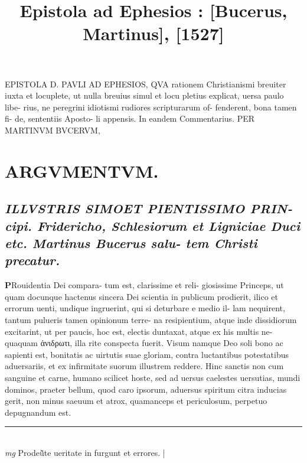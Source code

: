 \documentclass{article}
\begin{document}
\date{}
        \title{ Epistola ad Ephesios : [Bucerus, Martinus], [1527]}
\maketitle
\tableofcontents
\clearpage
\begin{pages} 
\beginnumbering
        EPISTOLA D. PAVLI AD EPHESIOS, QVA rationem Christianismi breuiter iuxta et locuplete, ut nulla breuius simul et locu pletius explicat, uersa paulo libe- rius, ne peregrini idiotismi rudiores scripturarum of- fenderent, bona tamen fi- de, sententiis Aposto- li appensis.  In eandem Commentarius.  PER MARTINVM BVCERVM, 
\section*{ARGVMENTVM.  }
{}
\subsection*{\textit{ILLVSTRIS SIMOET PIENTISSIMO PRIN- cipi.  Fridericho, Schlesiorum et Ligniciae Duci etc. Martinus Bucerus salu- tem Christi precatur.  }}\pstart \huge\textbf{P}\normalsize Rouidentia Dei compara- tum est, clarissime et reli- giosissime Princeps, ut quam docunque hactenus sincera Dei scientia in publicum prodierit, ilico et errorum uenti, undique ingruerint, qui si deturbare e medio il- lam nequirent, tantum pulueris tamen opinionum terre- na resipientium, atque inde dissidiorum excitarint, ut per paucis, hoc est, electis duntaxat, atque  ex his multis ne- quaquam ἀνιδρωτι, illa rite conspecta fuerit. Visum namque  Deo soli bono ac sapienti est, bonitatis ac uirtutis suae gloriam, contra luctantibus potestatibus aduersariis, et ex infirmitate suorum illustrem reddere. Hinc sanctis non cum sanguine et carne, humano scilicet hoste, sed ad uersus caelestes uersutias, mundi dominos, praeter bellum, quod caro ipsorum, aduersus spiritum citra inducias gerit, non minus saeuum et atrox, quamanceps et periculosum, perpetuo depugnandum est.   \pend
\vspace{0.5cm}\noindent
\vspace{0.2cm}\rule{1cm}{0.2pt}\\ 
\hspace{0.2cm}\textit{mg}
\footnotesize Prodeü̃te ueritate in furgunt et errores. 
\normalsize| 

\end{pages}
\end{document}
